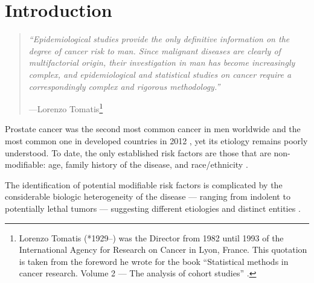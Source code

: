 %

\chapter{Introduction}

\begin{quote}
\textit{``Epidemiological studies provide the only definitive information on the degree of cancer risk to man. Since malignant diseases are clearly of multifactorial origin, their investigation in man has become increasingly complex, and epidemiological and statistical studies on cancer require a correspondingly complex and rigorous methodology.''}
\par\raggedleft---Lorenzo Tomatis\footnote{Lorenzo Tomatis (*1929--) was the Director from 1982 until 1993 of the International Agency for Research on Cancer in Lyon, France. This quotation is taken from the foreword he wrote for the book ``Statistical methods in cancer research. Volume 2 — The analysis of cohort studies'' \citep{breslow_statistical_1987}.}
\end{quote}

\bigskip


Prostate cancer was the second most common cancer in men worldwide and the most common one in developed countries in 2012 \citep{ferlay_cancer_2015}, yet its etiology remains poorly understood. To date, the only established risk factors are those that are non-modifiable: age, family history of the disease, and race/ethnicity \citep{gronberg_prostate_2003}. %

The identification of potential modifiable risk factors is  complicated by the considerable biologic heterogeneity of the disease --- ranging from indolent to potentially lethal tumors --- suggesting different etiologies and distinct entities \citep{discacciati_lifestyle_2014, jahn_high_2015}. %


